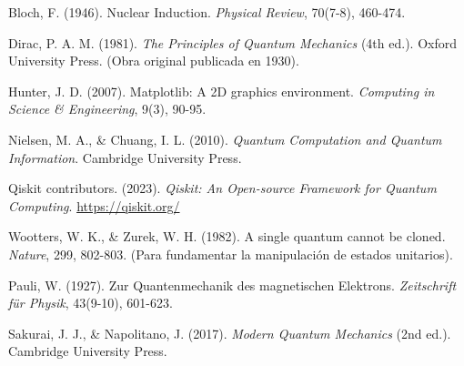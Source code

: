 \documentclass[11pt,a4paper,spanish]{book}
\begin{document}
\begin{thebibliography}{}

Bloch, F. (1946). Nuclear Induction. \emph{Physical Review}, 70(7-8), 460-474.

Dirac, P. A. M. (1981). \emph{The Principles of Quantum Mechanics} (4th ed.). Oxford University Press. (Obra original publicada en 1930).

Hunter, J. D. (2007). Matplotlib: A 2D graphics environment. \emph{Computing in Science \& Engineering}, 9(3), 90-95.

Nielsen, M. A., \& Chuang, I. L. (2010). \emph{Quantum Computation and Quantum Information}. Cambridge University Press.

Qiskit contributors. (2023). \emph{Qiskit: An Open-source Framework for Quantum Computing}. \url{https://qiskit.org/}

Wootters, W. K., \& Zurek, W. H. (1982). A single quantum cannot be cloned. \emph{Nature}, 299, 802-803. (Para fundamentar la manipulación de estados unitarios).

Pauli, W. (1927). Zur Quantenmechanik des magnetischen Elektrons. \emph{Zeitschrift für Physik}, 43(9-10), 601-623.

Sakurai, J. J., \& Napolitano, J. (2017). \emph{Modern Quantum Mechanics} (2nd ed.). Cambridge University Press.

\end{thebibliography}
% 
%
\end{document}
